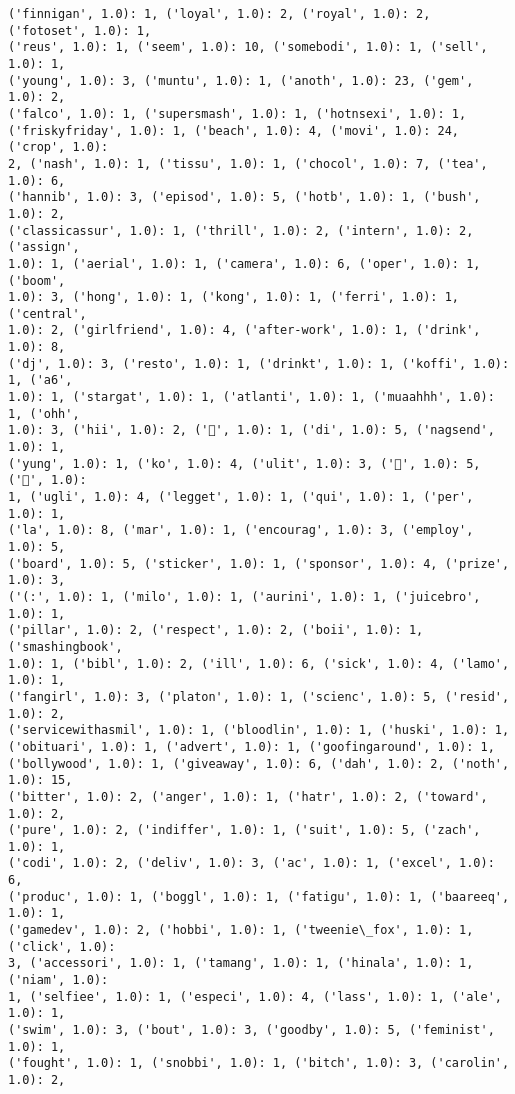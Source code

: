 \documentclass[11pt]{article}
\begin{document}
\begin{Verbatim}[commandchars=\\\{\}]
('finnigan', 1.0): 1, ('loyal', 1.0): 2, ('royal', 1.0): 2, ('fotoset', 1.0): 1,
('reus', 1.0): 1, ('seem', 1.0): 10, ('somebodi', 1.0): 1, ('sell', 1.0): 1,
('young', 1.0): 3, ('muntu', 1.0): 1, ('anoth', 1.0): 23, ('gem', 1.0): 2,
('falco', 1.0): 1, ('supersmash', 1.0): 1, ('hotnsexi', 1.0): 1,
('friskyfriday', 1.0): 1, ('beach', 1.0): 4, ('movi', 1.0): 24, ('crop', 1.0):
2, ('nash', 1.0): 1, ('tissu', 1.0): 1, ('chocol', 1.0): 7, ('tea', 1.0): 6,
('hannib', 1.0): 3, ('episod', 1.0): 5, ('hotb', 1.0): 1, ('bush', 1.0): 2,
('classicassur', 1.0): 1, ('thrill', 1.0): 2, ('intern', 1.0): 2, ('assign',
1.0): 1, ('aerial', 1.0): 1, ('camera', 1.0): 6, ('oper', 1.0): 1, ('boom',
1.0): 3, ('hong', 1.0): 1, ('kong', 1.0): 1, ('ferri', 1.0): 1, ('central',
1.0): 2, ('girlfriend', 1.0): 4, ('after-work', 1.0): 1, ('drink', 1.0): 8,
('dj', 1.0): 3, ('resto', 1.0): 1, ('drinkt', 1.0): 1, ('koffi', 1.0): 1, ('a6',
1.0): 1, ('stargat', 1.0): 1, ('atlanti', 1.0): 1, ('muaahhh', 1.0): 1, ('ohh',
1.0): 3, ('hii', 1.0): 2, ('🙈', 1.0): 1, ('di', 1.0): 5, ('nagsend', 1.0): 1,
('yung', 1.0): 1, ('ko', 1.0): 4, ('ulit', 1.0): 3, ('🎉', 1.0): 5, ('🎈', 1.0):
1, ('ugli', 1.0): 4, ('legget', 1.0): 1, ('qui', 1.0): 1, ('per', 1.0): 1,
('la', 1.0): 8, ('mar', 1.0): 1, ('encourag', 1.0): 3, ('employ', 1.0): 5,
('board', 1.0): 5, ('sticker', 1.0): 1, ('sponsor', 1.0): 4, ('prize', 1.0): 3,
('(:', 1.0): 1, ('milo', 1.0): 1, ('aurini', 1.0): 1, ('juicebro', 1.0): 1,
('pillar', 1.0): 2, ('respect', 1.0): 2, ('boii', 1.0): 1, ('smashingbook',
1.0): 1, ('bibl', 1.0): 2, ('ill', 1.0): 6, ('sick', 1.0): 4, ('lamo', 1.0): 1,
('fangirl', 1.0): 3, ('platon', 1.0): 1, ('scienc', 1.0): 5, ('resid', 1.0): 2,
('servicewithasmil', 1.0): 1, ('bloodlin', 1.0): 1, ('huski', 1.0): 1,
('obituari', 1.0): 1, ('advert', 1.0): 1, ('goofingaround', 1.0): 1,
('bollywood', 1.0): 1, ('giveaway', 1.0): 6, ('dah', 1.0): 2, ('noth', 1.0): 15,
('bitter', 1.0): 2, ('anger', 1.0): 1, ('hatr', 1.0): 2, ('toward', 1.0): 2,
('pure', 1.0): 2, ('indiffer', 1.0): 1, ('suit', 1.0): 5, ('zach', 1.0): 1,
('codi', 1.0): 2, ('deliv', 1.0): 3, ('ac', 1.0): 1, ('excel', 1.0): 6,
('produc', 1.0): 1, ('boggl', 1.0): 1, ('fatigu', 1.0): 1, ('baareeq', 1.0): 1,
('gamedev', 1.0): 2, ('hobbi', 1.0): 1, ('tweenie\_fox', 1.0): 1, ('click', 1.0):
3, ('accessori', 1.0): 1, ('tamang', 1.0): 1, ('hinala', 1.0): 1, ('niam', 1.0):
1, ('selfiee', 1.0): 1, ('especi', 1.0): 4, ('lass', 1.0): 1, ('ale', 1.0): 1,
('swim', 1.0): 3, ('bout', 1.0): 3, ('goodby', 1.0): 5, ('feminist', 1.0): 1,
('fought', 1.0): 1, ('snobbi', 1.0): 1, ('bitch', 1.0): 3, ('carolin', 1.0): 2,

\end{Verbatim}
\end{document}
